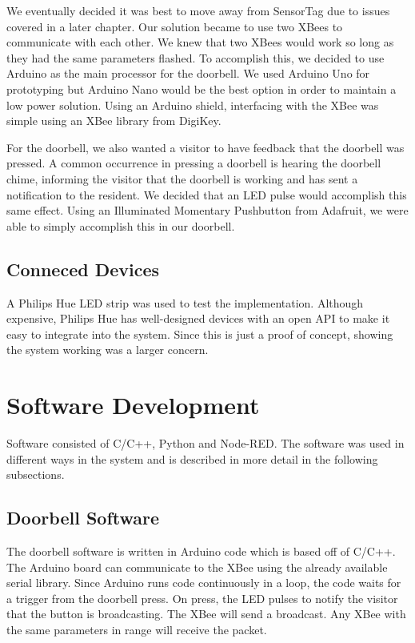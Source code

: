     We eventually decided it was best to move away from SensorTag due to issues covered in a later chapter. Our solution became to use two XBees to communicate with each other. We knew that two XBees would work so long as they had the same parameters flashed. To accomplish this, we decided to use Arduino as the main processor for the doorbell. We used Arduino Uno for prototyping but Arduino Nano would be the best option in order to maintain a low power solution. Using an Arduino shield, interfacing with the XBee was simple using an XBee library from DigiKey.
    
    For the doorbell, we also wanted a visitor to have feedback that the doorbell was pressed. A common occurrence in pressing a doorbell is hearing the doorbell chime, informing the visitor that the doorbell is working and has sent a notification to the resident. We decided that an LED pulse would accomplish this same effect. Using an Illuminated Momentary Pushbutton from Adafruit, we were able to simply accomplish this in our doorbell.

\subsection{Conneced Devices}
A Philips Hue LED strip was used to test the implementation. Although expensive, Philips Hue has well-designed devices with an open API to make it easy to integrate into the system. Since this is just a proof of concept, showing the system working was a larger concern.

\section{Software Development}
Software consisted of C/C++, Python and Node-RED. The software was used in different ways in the system and is described in more detail in the following subsections.

\subsection{Doorbell Software}
The doorbell software is written in Arduino code which is based off of C/C++. The Arduino board can communicate to the XBee using the already available serial library. Since Arduino runs code continuously in a loop, the code waits for a trigger from the doorbell press. On press, the LED pulses to notify the visitor that the button is broadcasting. The XBee will send a broadcast. Any XBee with the same parameters in range will receive the packet.

